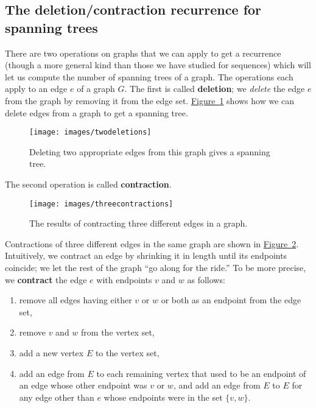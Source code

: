 \documentclass[10pt,]{book}
\newcommand{\terminology}[1]{\textbf{#1}}
\theoremstyle{plain}
\theoremstyle{definition}
\theoremstyle{definition}
\numberwithin{equation}{chapter}
\begin{document}
\subsection[{The deletion/contraction recurrence for spanning trees}]{The deletion/contraction recurrence for spanning trees}\label{subsection-26}
\hypertarget{p-666}{}%
There are two operations on graphs that we can apply to get a recurrence (though a more general kind than those we have studied for sequences) which will let us compute the number of spanning trees of a graph. The operations each apply to an edge \(e\) of a graph \(G\). The first is called \terminology{deletion}; we \emph{delete} the edge \(e\) from the graph by removing it from the edge set. \hyperref[twodeletions]{Figure~\ref{twodeletions}} shows how we can delete edges from a graph to get a spanning tree.%
\begin{figure}
\centering
\texttt{[image: images/twodeletions]}
\caption{Deleting two appropriate edges from this graph gives a spanning tree.\label{twodeletions}}
\end{figure}
\hypertarget{p-667}{}%
The second operation is called \terminology{contraction}.%
\begin{figure}
\centering
\texttt{[image: images/threecontractions]}
\caption{The results of contracting three different edges in a graph.\label{threecontractions}}
\end{figure}
\hypertarget{p-668}{}%
Contractions of three different edges in the same graph are shown in \hyperref[threecontractions]{Figure~\ref{threecontractions}}. Intuitively, we contract an edge by shrinking it in length until its endpoints coincide; we let the rest of the graph ``go along for the ride.'' To be more precise, we \terminology{contract} the edge \(e\) with endpoints \(v\) and \(w\) as follows: \leavevmode%
\begin{enumerate}
\item\hypertarget{li-23}{}\hypertarget{p-669}{}%
remove all edges having either \(v\) or \(w\) or both as an endpoint from the edge set,%
\item\hypertarget{li-24}{}\hypertarget{p-670}{}%
remove \(v\) and \(w\) from the vertex set,%
\item\hypertarget{li-25}{}\hypertarget{p-671}{}%
add a new vertex \(E\) to the vertex set,%
\item\hypertarget{li-26}{}\hypertarget{p-672}{}%
add an edge from \(E\) to each remaining vertex that used to be an endpoint of an edge whose other endpoint was \(v\) or \(w\), and add an edge from \(E\) to \(E\) for any edge other than \(e\) whose endpoints were in the set \(\{v,w\}\).%
\end{enumerate}
\end{document}
